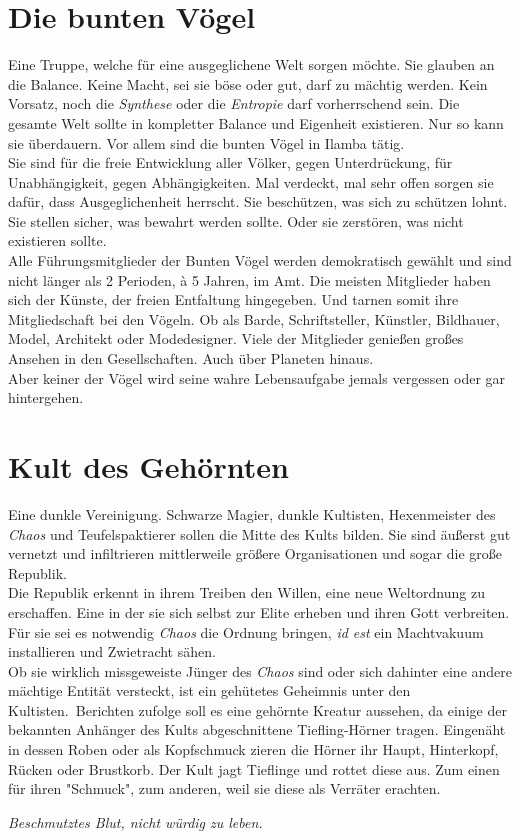 \documentclass{book}
\begin{document}
\section{Die bunten Vögel}
Eine Truppe, welche für eine ausgeglichene Welt sorgen möchte. Sie glauben an die Balance. Keine Macht, sei sie böse oder gut, darf zu mächtig werden. Kein Vorsatz, noch die \emph{Synthese} oder die \emph{Entropie} darf vorherrschend sein. Die gesamte Welt sollte in kompletter Balance und Eigenheit existieren. Nur so kann sie überdauern. Vor allem sind die bunten Vögel in Ilamba tätig.\\
Sie sind für die freie Entwicklung aller Völker, gegen Unterdrückung, für Unabhängigkeit, gegen Abhängigkeiten. Mal verdeckt, mal sehr offen sorgen sie dafür, dass Ausgeglichenheit herrscht. Sie beschützen, was sich zu schützen lohnt. Sie stellen sicher, was bewahrt werden sollte. Oder sie zerstören, was nicht existieren sollte.\\
Alle Führungsmitglieder der Bunten Vögel werden demokratisch gewählt und sind nicht länger als 2 Perioden, à 5 Jahren, im Amt. Die meisten Mitglieder haben sich der Künste, der freien Entfaltung hingegeben. Und tarnen somit ihre Mitgliedschaft bei den Vögeln. Ob als Barde, Schriftsteller, Künstler, Bildhauer, Model, Architekt oder Modedesigner. Viele der Mitglieder genießen großes Ansehen in den Gesellschaften. Auch über Planeten hinaus.\\
Aber keiner der Vögel wird seine wahre Lebensaufgabe jemals vergessen oder gar hintergehen.\\

\section{Kult des Gehörnten}
Eine dunkle Vereinigung. Schwarze Magier, dunkle Kultisten, Hexenmeister des \emph{Chaos} und Teufelspaktierer sollen die Mitte des Kults bilden. Sie sind äußerst gut vernetzt und infiltrieren mittlerweile größere Organisationen und sogar die große Republik.\\
Die Republik erkennt in ihrem Treiben den Willen, eine neue Weltordnung zu erschaffen. Eine in der sie sich selbst zur Elite erheben und ihren Gott verbreiten. Für sie sei es notwendig \emph{Chaos} die Ordnung bringen, {\it id est} ein Machtvakuum installieren und Zwietracht sähen.\\
Ob sie wirklich missgeweiste Jünger des \emph{Chaos} sind oder sich dahinter eine andere mächtige Entität versteckt, ist ein gehütetes Geheimnis unter den Kultisten. Berichten zufolge soll es eine gehörnte Kreatur aussehen, da einige der bekannten Anhänger des Kults abgeschnittene Tiefling-Hörner tragen. Eingenäht in dessen Roben oder als Kopfschmuck zieren die Hörner ihr Haupt, Hinterkopf, Rücken oder Brustkorb. Der Kult jagt Tieflinge und rottet diese aus. Zum einen für ihren "Schmuck", zum anderen, weil sie diese als Verräter erachten.
\begin{flushright}{\it Beschmutztes Blut, nicht würdig zu leben.}\end{flushright}
\end{document}
